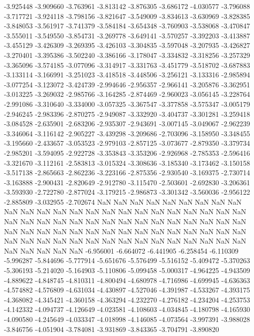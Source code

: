 -3.925448
-3.909660
-3.763961
-3.813142
-3.876305
-3.686172
-4.030577
-3.796088
-3.717721
-3.924118
-3.798156
-3.821647
-3.549009
-3.834613
-3.630969
-3.828385
-3.848053
-3.561917
-3.741379
-3.584184
-3.654348
-3.760903
-3.538068
-3.470847
-3.555011
-3.549550
-3.854731
-3.269778
-3.649141
-3.570257
-3.392203
-3.413887
-3.455129
-3.426309
-3.269395
-3.426103
-3.304835
-3.597048
-3.207935
-3.426827
-3.270401
-3.395386
-3.502240
-3.386166
-3.178047
-3.334832
-3.318256
-3.257329
-3.365096
-3.574185
-3.077096
-3.314917
-3.331763
-3.451779
-3.518702
-3.687883
-3.133114
-3.166991
-3.251023
-3.418518
-3.448506
-3.256121
-3.133316
-2.985894
-3.077254
-3.123072
-3.424739
-2.994646
-2.956357
-2.966141
-3.205876
-3.362951
-3.013225
-3.269032
-2.985766
-3.164285
-2.874469
-2.960023
-3.056145
-3.228764
-2.991086
-3.310640
-3.334000
-3.057325
-3.367547
-3.377858
-3.575347
-3.005179
-2.946245
-2.983396
-2.870275
-2.949087
-3.332920
-3.404737
-3.301281
-3.259418
-3.084528
-2.635901
-2.683206
-2.935307
-2.943691
-3.007145
-3.049067
-2.962239
-3.346064
-3.116142
-2.905227
-3.439298
-3.209686
-2.703096
-3.158950
-3.348455
-3.195660
-2.433657
-3.053523
-2.979103
-2.857125
-3.073677
-2.879350
-3.379734
-2.985201
-3.594095
-2.922728
-3.353843
-3.353206
-2.926968
-2.785353
-2.596416
-3.321670
-3.112161
-2.583813
-3.015324
-3.308636
-3.185340
-3.173462
-3.150158
-3.517138
-2.865663
-2.862236
-3.223166
-2.875356
-2.930540
-3.169375
-2.730714
-3.163888
-2.900431
-2.820649
-2.912780
-3.115470
-2.503601
-2.692830
-3.206361
-3.593930
-2.722780
-2.877024
-3.179215
-2.986873
-3.301342
-3.560036
-2.956122
-2.885809
-3.032955
-2.702674
NaN
NaN
NaN
NaN
NaN
NaN
NaN
NaN
NaN
NaN
NaN
NaN
NaN
NaN
NaN
NaN
NaN
NaN
NaN
NaN
NaN
NaN
NaN
NaN
NaN
NaN
NaN
NaN
NaN
NaN
NaN
NaN
NaN
NaN
NaN
NaN
NaN
NaN
NaN
NaN
NaN
NaN
NaN
NaN
NaN
NaN
NaN
NaN
NaN
NaN
NaN
NaN
NaN
NaN
NaN
NaN
NaN
NaN
NaN
NaN
NaN
NaN
NaN
NaN
NaN
NaN
NaN
NaN
NaN
NaN
NaN
NaN
NaN
NaN
-6.956001
-6.664072
-6.441905
-6.258454
-6.110309
-5.996287
-5.844696
-5.777914
-5.651676
-5.576499
-5.516152
-5.409472
-5.370263
-5.306193
-5.214020
-5.164903
-5.110806
-5.099458
-5.000317
-4.964225
-4.943509
-4.889622
-4.848745
-4.810311
-4.800494
-4.680978
-4.716986
-4.699945
-4.636363
-4.574882
-4.576809
-4.631034
-4.430897
-4.527046
-4.391987
-4.533267
-4.393175
-4.368082
-4.345421
-4.360158
-4.363294
-4.232270
-4.276182
-4.234204
-4.253753
-4.142332
-4.094737
-4.126649
-4.023581
-4.108603
-4.034845
-4.180798
-4.165930
-4.090580
-4.245649
-4.033347
-4.018998
-4.146085
-4.073564
-3.997391
-3.988028
-3.846756
-4.051904
-3.784081
-3.931869
-3.843365
-3.704791
-3.890820
